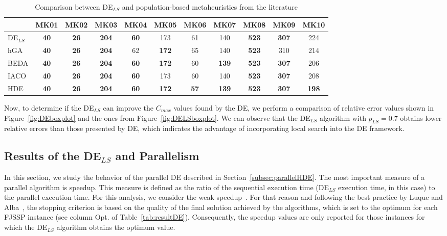 %
\begin{table}[!tb]
\scriptsize
  \centering
  \caption{Comparison between DE$_{LS}$ and population-based metaheuristics from the literature}
    \begin{tabular}{|l|cccccccccc|}
    \hline
    \multicolumn{1}{|r}{} & \multicolumn{1}{l}{MK01} & \multicolumn{1}{l}{MK02} & \multicolumn{1}{l}{MK03} & \multicolumn{1}{l}{MK04} & \multicolumn{1}{l}{MK05} & \multicolumn{1}{l}{MK06} & \multicolumn{1}{l}{MK07} & \multicolumn{1}{l}{MK08} & \multicolumn{1}{l}{MK09} & \multicolumn{1}{l|}{MK10} \\
    \hline
    DE$_{LS}$   & \textbf{40} & \textbf{26} & \textbf{204} & \textbf{60} & 173   & 61    & 140   & \textbf{523} & \textbf{307} & 224 \\
    hGA   & \textbf{40} & \textbf{26} & \textbf{204} & 62    & \textbf{172} & 65    & 140   & \textbf{523} & 310   & 214 \\
    BEDA  & \textbf{40} & \textbf{26} & \textbf{204} & \textbf{60} & \textbf{172} & 60    & \textbf{139} & \textbf{523} & \textbf{307} & 206 \\
    IACO  & \textbf{40} & \textbf{26} & \textbf{204} & \textbf{60} & 173   & 60    & 140   & \textbf{523} & \textbf{307} & 208 \\
    HDE   & \textbf{40} & \textbf{26} & \textbf{204} & \textbf{60} & \textbf{172} & \textbf{57} & \textbf{139} & \textbf{523} & \textbf{307} & \textbf{198} \\
\hline
    \end{tabular}%
  \label{tab:comparison}%
\end{table}%
%
Now, to determine if the DE$_{LS}$ can improve the $C_{max}$ values found by the DE, we perform a comparison of relative error values shown in Figure~\ref{fig:DEboxplot} and the ones from Figure~\ref{fig:DELSboxplot}. We can observe that the DE$_{LS}$ algorithm with $p_{LS}=0.7$ obtains lower relative errors than those presented by DE, which indicates the advantage of incorporating local search into the DE framework.

\subsection{Results of the DE$_{LS}$ and Parallelism} \label{subsec:resparallelDELS}

In this section, we study the behavior of the parallel DE described in Section~\ref{subsec:parallelHDE}. The most important measure of a parallel algorithm is speedup. This measure is defined as the ratio of the sequential execution time (DE$_{LS}$ execution time, in this case) to the parallel execution time. For this analysis, we consider the weak speedup~\cite{albaMeta2005}. For that reason and following the best practice by Luque and Alba~\cite{Luque:2013:PGA:2564896}, the stopping criterion is based on the quality of the final solution achieved by the algorithms, which is set to the optimum for each FJSSP instance (see column Opt. of Table~\ref{tab:resultDE}). Consequently, the speedup values are only reported for those instances for which the DE$_{LS}$ algorithm obtains the optimum value.

